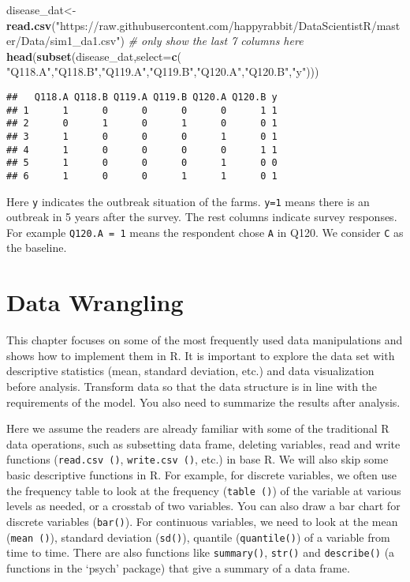 \documentclass[
]{article}
\newenvironment{Shaded}{\begin{snugshade}}{\end{snugshade}}
\newcommand{\CommentTok}[1]{\textcolor[rgb]{0.56,0.35,0.01}{\textit{#1}}}
\newcommand{\DataTypeTok}[1]{\textcolor[rgb]{0.13,0.29,0.53}{#1}}
\newcommand{\KeywordTok}[1]{\textcolor[rgb]{0.13,0.29,0.53}{\textbf{#1}}}
\newcommand{\NormalTok}[1]{#1}
\newcommand{\StringTok}[1]{\textcolor[rgb]{0.31,0.60,0.02}{#1}}
\begin{document}
\begin{Shaded}
\begin{Highlighting}[]
\NormalTok{disease_dat<-}\KeywordTok{read.csv}\NormalTok{(}\StringTok{"https://raw.githubusercontent.com/happyrabbit/DataScientistR/master/Data/sim1_da1.csv"}\NormalTok{)}
\CommentTok{# only show the last 7 columns here}
\KeywordTok{head}\NormalTok{(}\KeywordTok{subset}\NormalTok{(disease_dat,}\DataTypeTok{select=}\KeywordTok{c}\NormalTok{( }\StringTok{"Q118.A"}\NormalTok{,}\StringTok{"Q118.B"}\NormalTok{,}\StringTok{"Q119.A"}\NormalTok{,}\StringTok{"Q119.B"}\NormalTok{,}\StringTok{"Q120.A"}\NormalTok{,}\StringTok{"Q120.B"}\NormalTok{,}\StringTok{"y"}\NormalTok{))) }
\end{Highlighting}
\end{Shaded}

\begin{verbatim}
##   Q118.A Q118.B Q119.A Q119.B Q120.A Q120.B y
## 1      1      0      0      0      0      1 1
## 2      0      1      0      1      0      0 1
## 3      1      0      0      0      1      0 1
## 4      1      0      0      0      0      1 1
## 5      1      0      0      0      1      0 0
## 6      1      0      0      1      1      0 1
\end{verbatim}

Here \texttt{y} indicates the outbreak situation of the farms.
\texttt{y=1} means there is an outbreak in 5 years after the survey. The
rest columns indicate survey responses. For example
\texttt{Q120.A\ =\ 1} means the respondent chose \texttt{A} in Q120. We
consider \texttt{C} as the baseline.

\hypertarget{data-wrangling}{%
\section{Data Wrangling}\label{data-wrangling}}

This chapter focuses on some of the most frequently used data
manipulations and shows how to implement them in R. It is important to
explore the data set with descriptive statistics (mean, standard
deviation, etc.) and data visualization before analysis. Transform data
so that the data structure is in line with the requirements of the
model. You also need to summarize the results after analysis.

Here we assume the readers are already familiar with some of the
traditional R data operations, such as subsetting data frame, deleting
variables, read and write functions (\texttt{read.csv\ ()},
\texttt{write.csv\ ()}, etc.) in base R. We will also skip some basic
descriptive functions in R. For example, for discrete variables, we
often use the frequency table to look at the frequency
(\texttt{table\ ()}) of the variable at various levels as needed, or a
crosstab of two variables. You can also draw a bar chart for discrete
variables (\texttt{bar()}). For continuous variables, we need to look at
the mean (\texttt{mean\ ()}), standard deviation (\texttt{sd()}),
quantile (\texttt{quantile()}) of a variable from time to time. There
are also functions like \texttt{summary()}, \texttt{str()} and
\texttt{describe()} (a functions in the `psych' package) that give a
summary of a data frame.
\end{document}
